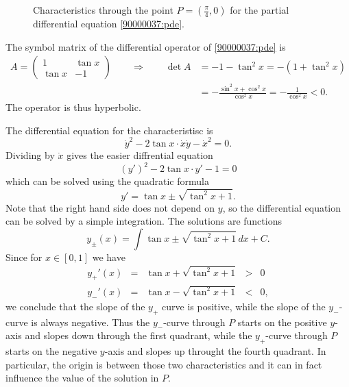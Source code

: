 \begin{loesung}
\begin{figure}
\centering
{}
\caption{Characteristics through the point $P=(\frac{\pi}4,0)$ for
the partial differential equation \eqref{90000037:pde}.
\label{90000037:graph}}
\end{figure}
\begin{teilaufgaben}
\item
The symbol matrix of the differential operator of
\eqref{90000037:pde}
is
\begin{align*}
A
=
\begin{pmatrix}
   1   & \tan x \\
\tan x &  -1
\end{pmatrix}
\qquad\Rightarrow\qquad
\det A
&=
-1 - \tan^2 x
=
-(1+\tan^2x)
\\
&=
\displaystyle
-\frac{\sin^2x +\cos^2 x}{\cos^2x}
=
-
\frac{1}{\cos^2x}
<
0.
\end{align*}
The operator is thus hyperbolic.
\item
The differential equation for the characteristisc is
\[
\dot{y}^2 - 2\tan x\cdot \dot{x}\dot{y} - \dot{x}^2 = 0.
\]
Dividing by $\dot{x}$ gives the easier diffrential equation
\[
(y')^2 - 2\tan x\cdot y' - 1 = 0
\]
which can be solved using the quadratic formula
\begin{equation}
y'
=
\tan x \pm\!\sqrt{\tan^2 x+1}.
\label{90000037:dgl}
\end{equation}
Note that the right hand side does not depend on $y$, so the differential
equation can be solved by a simple integration.
The solutions are functions
\[
y_{\pm}(x)
=
\int
\tan x \pm\!\sqrt{\tan^2 x+1}
\,dx
+ C.
\]
Since for $x\in [0,1]$ we have
\[
\renewcommand{\arraycolsep}{2pt}
\begin{array}{rcccl}
y_+'(x) &=& \tan x +\!\sqrt{\tan^2 x+1} &>& 0
\\
y_-'(x) &=& \tan x -\!\sqrt{\tan^2 x+1} &<& 0,
\end{array}
\]
we conclude that the slope of the $y_+$ curve is positive,
while the slope of the $y_-$-curve is always negative.
Thus the $y_-$-curve through $P$ starts on the positive $y$-axis
and slopes down through the first quadrant,
while the $y_+$-curve through $P$ starts on the negative $y$-axis
and slopes up throught the fourth quadrant.
In particular, the origin is between those two characteristics
and it can in fact influence the value of the solution in $P$.
\qedhere
\end{teilaufgaben}
\end{loesung}

